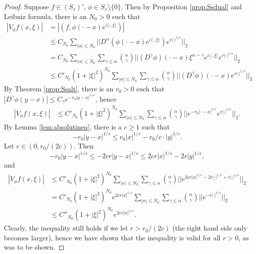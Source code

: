 \documentclass[10pt,a4paper]{amsart}
\begin{document}
\begin{proof}
Suppose $f\in (S_s)'$, $\phi\in S_s\setminus\{0\}$. Then by Proposition \ref{prop:Ssdual} and Leibniz formula, there is an $N_0>0$ such that
\begin{align*}
    |V_\phi f(x,\xi)| &= |(f,\phi(\cdot-x)e^{i\langle\cdot,\xi\rangle})|  \\
    &\leq C_{N_0} \sum_{|\alpha|\leq N_0} || D^\alpha \left(\phi(\cdot-x)e^{i\langle \cdot,\xi\rangle}\right) e^{r|\cdot|^{1/s}}||_2\\
    &= C_{N_0} \sum_{|\alpha|\leq N_0}\sum_{\gamma\leq\alpha}\binom{\alpha}{\gamma} || (D^\gamma \phi)(\cdot-x) \xi^{\alpha-\gamma} e^{i\langle \cdot,\xi\rangle} e^{r|\cdot|^{1/s}}||_2 \\
    &\leq C'_{N_0} (1+|\xi|^2)^{N_0} \sum_{|\alpha|\leq N_0}\sum_{\gamma\leq\alpha}\binom{\alpha}{\gamma} || (D^\gamma \phi)(\cdot-x) e^{r|\cdot|^{1/s}}||_2
\end{align*}
By Theorem \ref{prop:Ssalt}, there is an $r_0>0$ such that $|D^{\gamma}\phi(y-x)|\leq C_\gamma e^{-r_0|y-x|^{1/s}}$, hence
\begin{align*}
    |V_\phi f(x,\xi)| &\leq C'_{N_0} (1+|\xi|^2)^{N_0} \sum_{|\alpha|\leq N_0}\sum_{\gamma\leq\alpha}\binom{\alpha}{\gamma} || e^{-r_0|\cdot-x|^{1/s}} e^{r|\cdot|^{1/s}}||_2.
\end{align*}
By Lemma \ref{lem:absolutineq}, there is a $c\geq 1$ such that
\begin{equation*}
    - r_0|y-x|^{1/s} \leq   r_0 |x|^{1/s} - r_0/c \cdot |y|^{1/s}.
\end{equation*}
Let $r\in (0, r_0 /(2c))$. Then
\begin{equation*}
    - r_0|y-x|^{1/s} \leq - 2 c r|y-x|^{1/s} \leq  2 c r |x|^{1/s} - 2 r |y|^{1/s},
\end{equation*}
and
\begin{align*}
    |V_\phi f(x,\xi)| &\leq C'_{N_0} (1+|\xi|^2)^{N_0} \sum_{|\alpha|\leq N_0}\sum_{\gamma\leq\alpha}\binom{\alpha}{\gamma} || e^{2cr |x|^{1/s} - 2 r |\cdot|^{1/s} + r|\cdot|^{1/s}}||_2 \\
    &=C'_{N_0} (1+|\xi|^2)^{N_0} e^{2 c r |x|^{1/s}} \sum_{|\alpha|\leq N_0}\sum_{\gamma\leq\alpha}\binom{\alpha}{\gamma} ||  e^{-r|\cdot|^{1/s}}||_2  \\
    &\leq C''_{N_0} (1+|\xi|^2)^{N_0} e^{2 c r |x|^{1/s}}.
\end{align*}
Clearly, the inequality still holds if we let $r>r_0/(2c)$ (the right hand side only becomes larger), hence we have shown that the inequality is valid for all $r>0$, as was to be shown.


\end{proof}
\end{document}
